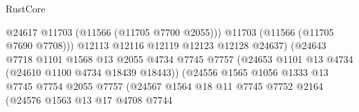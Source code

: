 \begin{lexlean}{RustCore}
\begin{coremodule}
                                                  @24617
                                                  @11703
                                                  (@11566 (@11705 @7700 @2055)))
                                                @11703
                                                (@11566 (@11705 @7690 @7708)))
                                              @12113
                                              @12116
                                              @12119
                                              @12123
                                              @12128
                                              @24637)
                                            (@24643
                                              @7718
                                              @1101
                                              @1568
                                              @13
                                              @2055
                                              @4734
                                              @7745
                                              @7757
                                              (@24653
                                                @1101
                                                @13
                                                @4734
                                                (@24610 @1100 @4734 @18439 @18443))
                                              (@24556
                                                @1565
                                                @1056
                                                @1333
                                                @13
                                                @7745
                                                @7754
                                                @2055
                                                @7757
                                                (@24567
                                                  @1564
                                                  @18
                                                  @11
                                                  @7745
                                                  @7752
                                                  @2164
                                                  (@24576
                                                    @1563
                                                    @13
                                                    @17
                                                    @4708
                                                    @7744

\end{coremodule}
\end{lexlean}
